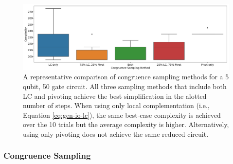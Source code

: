 \begin{figure}[t]
\centering
\includegraphics[width=13cm]{img/cong-sampling-ex.png}
\caption{
  A representative comparison of congruence sampling methods for a 5 qubit, 50 gate circuit.
  All three sampling methods that include both LC and pivoting achieve the best simplification in the alotted number of steps.
  When using only local complementation (i.e., Equation \ref{eq:gen-io-lc}), the same best-case complexity is achieved over the 10 trials but the average complexity is higher.
  Alternatively, using only pivoting does not achieve the same reduced circuit.
}
\label{fig:cong-sampling}
\end{figure}

\subsubsection*{Congruence Sampling}

